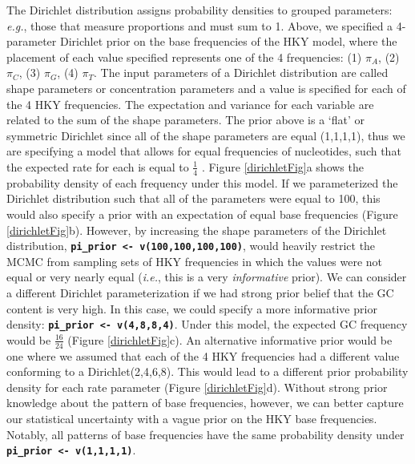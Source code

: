 \documentclass[11pt]{article}
\newcommand{\cl}[1]{{\texttt{\textbf{#1}}}}
\begin{document}
The Dirichlet distribution assigns probability densities to grouped parameters: {\it e.g.}, those that measure proportions and must sum to 1. 
Above, we specified a 4-parameter Dirichlet prior on the base frequencies of the HKY model, where the placement of each value specified represents one of the 4 frequencies: 
(1) $\pi_A$, 
(2) $\pi_C$, 
(3) $\pi_G$, 
(4) $\pi_T$.
The input parameters of a Dirichlet distribution are called shape parameters or concentration parameters and a value is specified for each of the 4 HKY frequencies. 
The expectation and variance for each variable are related to the sum of the shape parameters.
The prior above is a `flat' or symmetric Dirichlet since all of the shape parameters are equal (1,1,1,1), thus we are specifying a model that allows for equal frequencies of nucleotides, such that the expected rate for each is equal to $\frac{1}{4}$ \citep{zwickl04}.
Figure \ref{dirichletFig}a shows the probability density of each frequency under this model.
If we parameterized the Dirichlet distribution such that all of the parameters were equal to 100, this would also specify a prior with an expectation of equal base frequencies (Figure \ref{dirichletFig}b). 
However, by increasing the shape parameters of the Dirichlet distribution, \cl{pi\_prior <- v(100,100,100,100)}, would heavily restrict the MCMC from sampling sets of HKY frequencies in which the values were not equal or very nearly equal ({\it i.e.}, this is a very {\em informative} prior). 
We can consider a different Dirichlet parameterization if we had strong prior belief that the GC content is very high.
In this case, we could specify a more informative prior density: \cl{pi\_prior <- v(4,8,8,4)}. 
Under this model, the expected GC frequency would be $\frac{16}{24}$ (Figure \ref{dirichletFig}c). 
An alternative informative prior would be one where we assumed that each of the 4 HKY frequencies had a different value conforming to a Dirichlet(2,4,6,8). 
This would lead to a different prior probability density for each rate parameter (Figure \ref{dirichletFig}d).
Without strong prior knowledge about the pattern of base frequencies, however, we can better capture our statistical uncertainty with a vague prior on the HKY base frequencies. 
Notably, all patterns of base frequencies have the same probability density under \cl{pi\_prior <- v(1,1,1,1)}.
\end{document}
